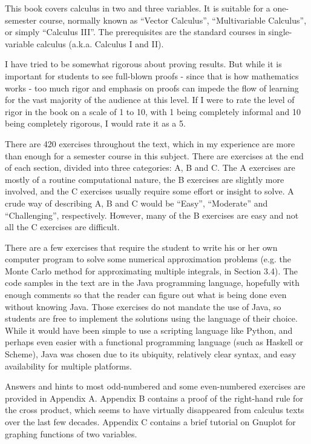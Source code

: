 This book covers calculus in two and three variables. It is suitable for a one-semester course, normally known as
``Vector Calculus'', ``Multivariable Calculus'', or simply ``Calculus III''. The prerequisites are the standard courses
in single-variable calculus (a.k.a. Calculus I and II).

I have tried to be somewhat rigorous about proving results. But while it is important for students to
see full-blown proofs - since that is how mathematics works - too much rigor and emphasis on proofs
can impede the flow
of learning for the vast majority of the audience at this level. If I were to rate the level of rigor in the book on a
scale of 1 to 10, with 1 being completely informal and 10 being completely rigorous, I would rate it as a 5.

There are 420 exercises throughout the text, which in my experience are more than enough for a semester course in
this subject.
There are exercises at the end of each section, divided into three categories: A, B and C. The A exercises are mostly
of a routine computational nature, the B exercises are slightly more involved, and the C exercises usually require
some effort or insight to solve. A crude way of describing A, B and C would be ``Easy'', ``Moderate'' and
``Challenging'', respectively. However, many of the B exercises are easy and not all
the C exercises are difficult.

There are a few exercises that require the student to write his or her own computer program
to solve some numerical approximation problems (e.g. the Monte Carlo method for approximating multiple integrals, in
Section 3.4).
The code samples in the text are in the Java programming language, hopefully with enough comments so that the reader can
figure out what is being done even without knowing Java. Those exercises do not mandate the use of Java, so
students are free to implement the solutions using the language of their choice. While it would have been simple to
use a scripting language like Python, and perhaps even easier with a functional programming language (such as Haskell or
Scheme), Java was chosen due to its ubiquity, relatively clear syntax, and easy availability for multiple platforms.

Answers and hints to most odd-numbered and some even-numbered exercises are
provided in Appendix A. Appendix B contains a proof of the right-hand rule for the cross product, which seems to have
virtually disappeared from calculus texts
over the last few decades. Appendix C contains a brief tutorial on Gnuplot for graphing functions of two variables.

